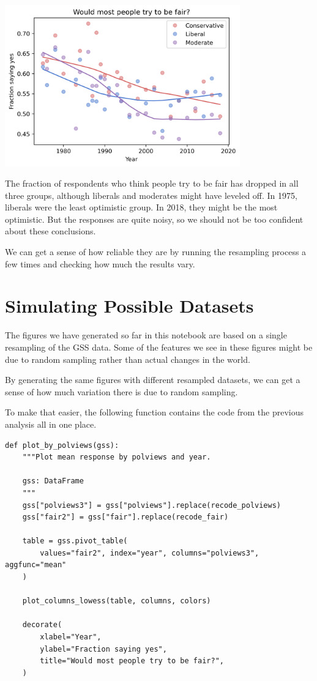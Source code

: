 \begin{center}
\includegraphics[width=4in]{chapters/03_outlook_files/03_outlook_54_0.png}
\end{center}

The fraction of respondents who think people try to be fair has dropped
in all three groups, although liberals and moderates might have leveled
off. In 1975, liberals were the least optimistic group. In 2018, they
might be the most optimistic. But the responses are quite noisy, so we
should not be too confident about these conclusions.

We can get a sense of how reliable they are by running the resampling
process a few times and checking how much the results vary.

\hypertarget{simulating-possible-datasets}{%
\section{Simulating Possible
Datasets}\label{simulating-possible-datasets}}

The figures we have generated so far in this notebook are based on a
single resampling of the GSS data. Some of the features we see in these
figures might be due to random sampling rather than actual changes in
the world.

By generating the same figures with different resampled datasets, we can
get a sense of how much variation there is due to random sampling.

To make that easier, the following function contains the code from the
previous analysis all in one place.

\begin{lstlisting}[]
def plot_by_polviews(gss):
    """Plot mean response by polviews and year.

    gss: DataFrame
    """
    gss["polviews3"] = gss["polviews"].replace(recode_polviews)
    gss["fair2"] = gss["fair"].replace(recode_fair)

    table = gss.pivot_table(
        values="fair2", index="year", columns="polviews3", aggfunc="mean"
    )

    plot_columns_lowess(table, columns, colors)

    decorate(
        xlabel="Year",
        ylabel="Fraction saying yes",
        title="Would most people try to be fair?",
    )
\end{lstlisting}


